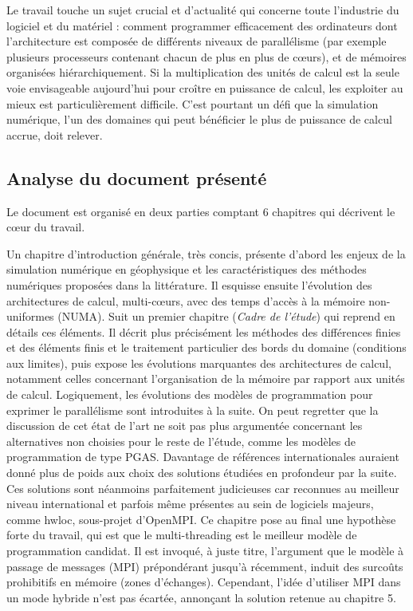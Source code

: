 \documentclass[a4paper,12pt]{article}
\begin{document}
Le travail touche un sujet crucial et d'actualité qui concerne toute l'industrie
du logiciel et du matériel : comment programmer efficacement des
ordinateurs dont l'architecture est composée de différents niveaux
de parallélisme (par exemple plusieurs processeurs contenant chacun
de plus en plus de c{\oe}urs), et de mémoires organisées hiérarchiquement.
Si la multiplication des unités de calcul est la seule voie envisageable
aujourd'hui pour croître en puissance de calcul, les exploiter
au mieux est particulièrement difficile. C'est pourtant un défi
que la simulation numérique, l'un des domaines qui peut bénéficier
le plus de puissance de calcul accrue, doit relever.


\subsection*{Analyse du document présenté}

Le document est organisé en deux parties comptant 6 chapitres qui
décrivent le c{\oe}ur du travail.

Un chapitre d'introduction générale, très concis, présente d'abord les enjeux
de la simulation numérique en géophysique et les caractéristiques des  
méthodes numériques proposées dans la littérature. 
Il esquisse ensuite l'évolution des architectures de calcul, multi-c{\oe}urs,
avec des temps d'accès à la mémoire non-uniformes (NUMA).
Suit un premier chapitre (\textit{Cadre de l'étude}) qui reprend en
détails ces éléments. Il décrit plus précisément les méthodes
des différences finies et des éléments finis et le traitement particulier
des bords du domaine (conditions aux limites), puis expose les
évolutions marquantes des architectures de calcul, notamment 
celles concernant l'organisation de la mémoire par rapport aux
unités de calcul. Logiquement, les évolutions des modèles de 
programmation pour exprimer le parallélisme sont introduites 
à la suite. On peut regretter que la discussion de cet état de
l'art ne soit pas plus argumentée concernant les alternatives
non choisies pour le reste de l'étude, comme les modèles de 
programmation de type PGAS. Davantage de références internationales
auraient donné plus de poids aux choix des solutions étudiées
en profondeur par la suite. Ces solutions sont néanmoins parfaitement 
judicieuses car reconnues au meilleur niveau international et
parfois même présentes au sein de logiciels majeurs, comme hwloc,
sous-projet d'OpenMPI.
Ce chapitre pose au final une hypothèse forte du travail, qui
est que le multi-threading est le meilleur modèle de programmation
candidat. Il est invoqué, à juste titre, l'argument que le modèle à
passage de messages (MPI) prépondérant jusqu'à récemment, induit
des surcoûts prohibitifs en mémoire (zones d'échanges). Cependant,
l'idée d'utiliser MPI dans un mode hybride n'est pas écartée,
annonçant la solution retenue au chapitre 5.\\
\end{document}
